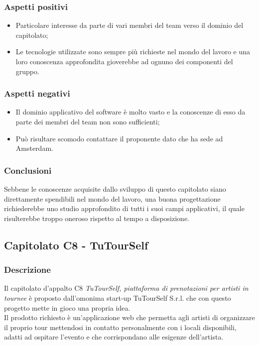 		\subsubsection{Aspetti positivi}
		\begin{itemize}
			\item Particolare interesse da parte di vari membri del team verso il dominio del capitolato;
			\item Le tecnologie utilizzate sono sempre più richieste nel mondo del lavoro e una loro conoscenza approfondita gioverebbe ad ognuno dei componenti del gruppo.
		\end{itemize}
		\subsubsection{Aspetti negativi}
		\begin{itemize}
			\item Il dominio applicativo del software è molto vasto e la conoscenze di esso da parte dei membri del team non sono sufficienti;
			\item Può risultare scomodo contattare il proponente dato che ha sede ad Amsterdam.
		\end{itemize}
		\subsubsection{Conclusioni}
		Sebbene le conoscenze acquisite dallo sviluppo di questo capitolato siano direttamente spendibili nel mondo del lavoro, una buona progettazione richiederebbe uno studio approfondito di tutti i suoi campi applicativi, il quale risulterebbe troppo oneroso rispetto al tempo a disposizione.
	
	\subsection{Capitolato C8 - TuTourSelf}
		\subsubsection{Descrizione}
		Il capitolato d'appalto C8 \emph{TuTourSelf, piattaforma di prenotazioni per artisti in tournee} è proposto dall'omonima start-up TuTourSelf S.r.l. che con questo progetto mette in gioco una propria idea.\\ Il prodotto richiesto è un'applicazione web che permetta agli artisti di organizzare il proprio tour mettendosi in contatto personalmente con i locali disponibili, adatti ad ospitare l'evento e che corrispondano alle esigenze dell'artista. 
